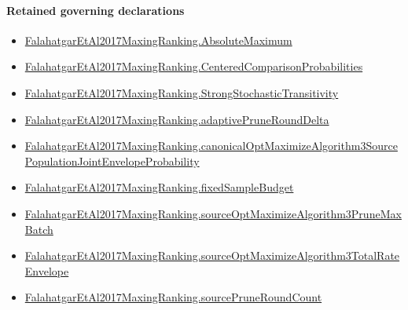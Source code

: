 \documentclass[10pt]{article}
\begin{document}
\paragraph{Retained governing declarations}
\begin{itemize}\raggedright
\item \hyperlink{paper-prerequisite-9c0d6111ba7505a4}{Falahatgar\allowbreak{}Et\allowbreak{}Al2017\allowbreak{}Maxing\allowbreak{}Ranking.\allowbreak{}Absolute\allowbreak{}Maximum}
\item \hyperlink{paper-prerequisite-b99b697ef57f53ce}{Falahatgar\allowbreak{}Et\allowbreak{}Al2017\allowbreak{}Maxing\allowbreak{}Ranking.\allowbreak{}Centered\allowbreak{}Comparison\allowbreak{}Probabilities}
\item \hyperlink{paper-prerequisite-76807884cf8ad345}{Falahatgar\allowbreak{}Et\allowbreak{}Al2017\allowbreak{}Maxing\allowbreak{}Ranking.\allowbreak{}Strong\allowbreak{}Stochastic\allowbreak{}Transitivity}
\item \hyperlink{governing-declaration-0a2d9c4ad2e46f08}{Falahatgar\allowbreak{}Et\allowbreak{}Al2017\allowbreak{}Maxing\allowbreak{}Ranking.\allowbreak{}adaptive\allowbreak{}Prune\allowbreak{}Round\allowbreak{}Delta}
\item \hyperlink{governing-declaration-7b2c3703a7927e84}{Falahatgar\allowbreak{}Et\allowbreak{}Al2017\allowbreak{}Maxing\allowbreak{}Ranking.\allowbreak{}canonical\allowbreak{}Opt\allowbreak{}Maximize\allowbreak{}Algorithm3\allowbreak{}Source\allowbreak{}Population\allowbreak{}Joint\allowbreak{}Envelope\allowbreak{}Probability}
\item \hyperlink{governing-declaration-4b4daf4bb2493573}{Falahatgar\allowbreak{}Et\allowbreak{}Al2017\allowbreak{}Maxing\allowbreak{}Ranking.\allowbreak{}fixed\allowbreak{}Sample\allowbreak{}Budget}
\item \hyperlink{governing-declaration-0a860a2e672923f2}{Falahatgar\allowbreak{}Et\allowbreak{}Al2017\allowbreak{}Maxing\allowbreak{}Ranking.\allowbreak{}source\allowbreak{}Opt\allowbreak{}Maximize\allowbreak{}Algorithm3\allowbreak{}Prune\allowbreak{}Max\allowbreak{}Batch}
\item \hyperlink{governing-declaration-fab12a5aaba06c3a}{Falahatgar\allowbreak{}Et\allowbreak{}Al2017\allowbreak{}Maxing\allowbreak{}Ranking.\allowbreak{}source\allowbreak{}Opt\allowbreak{}Maximize\allowbreak{}Algorithm3\allowbreak{}Total\allowbreak{}Rate\allowbreak{}Envelope}
\item \hyperlink{governing-declaration-7a4a97da03826b66}{Falahatgar\allowbreak{}Et\allowbreak{}Al2017\allowbreak{}Maxing\allowbreak{}Ranking.\allowbreak{}source\allowbreak{}Prune\allowbreak{}Round\allowbreak{}Count}
\end{itemize}
\end{document}
